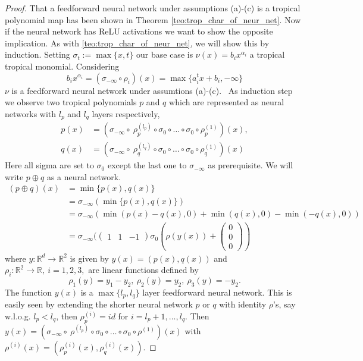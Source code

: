 \documentclass{article}
\theoremstyle{definition}
\begin{document}
\begin{proof}
That a feedforward neural network under assumptions (a)-(c) is a tropical polynomial map has been shown in Theorem \ref{teo:trop_char_of_neur_net}. Now if the neural network has ReLU activations we want to show the opposite implication. As with \ref{teo:trop_char_of_neur_net}, we will show this by induction. Setting $\sigma_{t} := \max \{ x, t\}$ our base case is $\nu (x) = b_{i} x^{\alpha_{i}}$ a tropical tropical monomial. Considering
$$b_{i}x^{\alpha_{i}} = (\sigma_{- \infty} \circ \rho_{i})(x) = \max \{ a_{i}^{t}x + b_{i}, -\infty \}$$
$\nu$ is a feedforward neural network under assumtions (a)-(c). \
As induction step we observe two tropical polynomials $p$ and $q$ which are represented as neural networks with $l_{p}$ and $l_{q}$ layers respectively,
\begin{align*}
p(x) &= (\sigma_{- \infty} \circ \ \rho_{p}^{(l_{p})} \circ \sigma_{0} \circ \dots \circ \sigma_{0} \circ \rho_{p}^{(1)})(x), \\
q(x) &= (\sigma_{- \infty} \circ \ \rho_{q}^{(l_{q})} \circ \sigma_{0} \circ \dots \circ \sigma_{0} \circ \rho_{q}^{(1)})(x)
\end{align*}
Here all sigma are set to $\sigma_{0}$ except the last one to $\sigma_{- \infty}$ as prerequisite. We will write $p \oplus q$ as a neural network.
\begin{align*}
(p \oplus q)(x) 
&= \min \{ p(x), q(x) \} \\
&= \sigma_{- \infty }( \min \{ p(x), q(x) \} ) \\
&= \sigma_{- \infty }( \min(p(x)-q(x), 0) + \min(q(x), 0) - \min(-q(x), 0)) \\
&= \sigma_{- \infty }(\begin{pmatrix} 1 & 1 & -1 \end{pmatrix} \sigma_{0}(\rho(y(x)) + \begin{pmatrix} 0 \\ 0 \\ 0 \end{pmatrix})
\end{align*}
where $y:\mathbb{R}^{d} \to \mathbb{R}^{2}$ is given by $y(x)=(p(x),q(x))$ and $\rho_{i}:\mathbb{R}^{2} \to \mathbb{R}, \ i=1,2, 3,$ are linear functions defined by
$$\rho_{1}(y)=y_{1}-y_{2}, \ \rho_{2}(y)=y_{2}, \ \rho_{3}(y)= -y_{2}.$$
The function $y(x)$ is a $\max \{ l_{p}, l_{q} \}$ layer feedforward neural network. This is easily seen by extending the shorter neural network $p$ or $q$ with identity $\rho$'s, say w.l.o.g. $l_{p} < l_{q}$, then $\rho^{(i)}_{p} = id$ for $i = l_{p} + 1, \dots , l_{q}$. Then $y(x)=(\sigma_{- \infty} \circ \ \rho^{(l_{p})} \circ \sigma_{0} \circ \dots \circ \sigma_{0} \circ \rho^{(1)})(x)$ with $\rho^{(i)}(x) = (\rho_{p}^{(i)}(x), \rho_{q}^{(i)}(x))$.

\end{proof}
\end{document}
